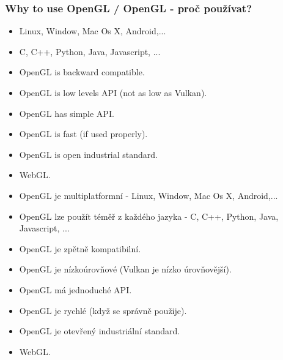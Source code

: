 \begin{frame}\frametitle{Why to use OpenGL / OpenGL - proč používat?}\scriptsize
\begin{itemize}
  \item Linux, Window, Mac Os X, Android,...
  \item C, C++, Python, Java, Javascript, ...
  \item OpenGL is backward compatible.
  \item OpenGL is low levels API (not as low as Vulkan).
  \item OpenGL has simple API.
  \item OpenGL is fast (if used properly).
  \item OpenGL is open industrial standard.
  \item WebGL.
\end{itemize}

\begin{itemize}
  \item OpenGL je multiplatformní - Linux, Window, Mac Os X, Android,...
  \item OpenGL lze použít téměř z každého jazyka - C, C++, Python, Java, Javascript, ...
  \item OpenGL je zpětně kompatibilní.
  \item OpenGL je nízkoúrovňové (Vulkan je nízko úrovňovější).
  \item OpenGL má jednoduché API.
  \item OpenGL je rychlé (když se správně použije).
  \item OpenGL je otevřený industriální standard.
  \item WebGL.
\end{itemize}
\end{frame}


